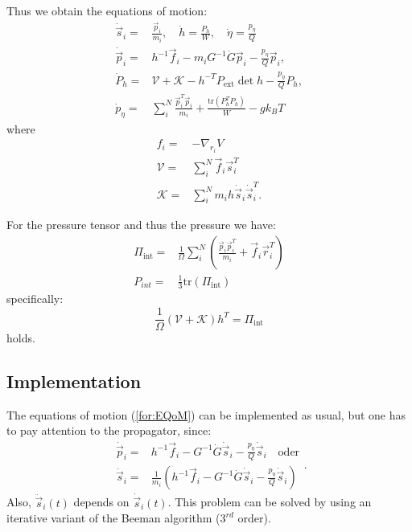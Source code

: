 Thus we obtain the equations of motion:
\begin{equation}
  \label{for:EQoM}
  \begin{split}
    \dot{\vec{s}}_i = 
    & \frac{\vec{p}_i}{m_i}, \quad \dot{h} = \frac{P_h}{W}, \quad \dot{\eta} = \frac{p_\eta}{Q} \\
    \dot{\vec{p}}_i = 
    & h^{-1}\vec{f}_i-m_iG^{-1}\dot{G}\vec{p}_i-\frac{p_\eta}{Q}\vec{p}_i ,\\
    \dot{P}_h = 
    & \mathcal{V}+\mathcal{K}-h^{-T}P_\mathrm{ext}\det{h}-\frac{p_\eta}{Q}P_h ,\\
    \dot{p}_\eta =
    & \sum_i^N\frac{\vec{p}_i^T\vec{p}_i}{m_i}+\frac{\mathrm{tr}(P_h^TP_h)}{W}-g k_B T
  \end{split}
\end{equation}
where
\begin{equation}
  \begin{split}
    f_i = 
    & -\nabla_{r_i} V \\
    \mathcal{V} = 
    & \sum_i^N\vec{f}_i\vec{s}^T_i \\
    \mathcal{K} = 
    & \sum_i^N m_i h \dot{\vec{s}}_i \dot{\vec{s}}_i^T 
    .    
  \end{split}
\end{equation}

For the pressure tensor and thus the pressure we have:
\begin{equation}
  \begin{split}
    \Pi_\mathrm{int} = 
    & \frac{1}{\Omega}\sum_i^N\left(\frac{\vec{p}_i \vec{p}_i^T}{m_i}+\vec{f}_i\vec{r}_i^T \right) \\
    P_{int} = 
    & \frac{1}{3} \mathrm{tr}(\Pi_\mathrm{int}) 
  \end{split}
\end{equation}
specifically:
\begin{equation}
  \frac{1}{\Omega}(\mathcal{V}+\mathcal{K})h^T = \Pi_\mathrm{int}
\end{equation}
holds.

\subsection{Implementation}
The equations of motion (\ref{for:EQoM}) can be implemented as usual, but one has to pay attention to the propagator, since:
\begin{equation}
  \begin{split}
    \dot{\vec{p}}_i = 
    & h^{-1}\vec{f}_i-G^{-1}\dot{G}\dot{\vec{s}}_i-\frac{p_\eta}{Q}\dot{\vec{s}}_i \quad \textrm{oder}\\
    \ddot{\vec{s}}_i = 
    & \frac{1}{m_i}\left(h^{-1}\vec{f}_i-G^{-1}\dot{G}\dot{\vec{s}}_i-\frac{p_\eta}{Q}\dot{\vec{s}}_i\right)
  \end{split}
.
\end{equation}
Also, \( \ddot{\vec{s}}_i(t) \) depends on \( \dot{\vec{s}}_i(t) \). This problem can be solved by using an iterative variant of the Beeman algorithm ($3^{rd}$ order).
